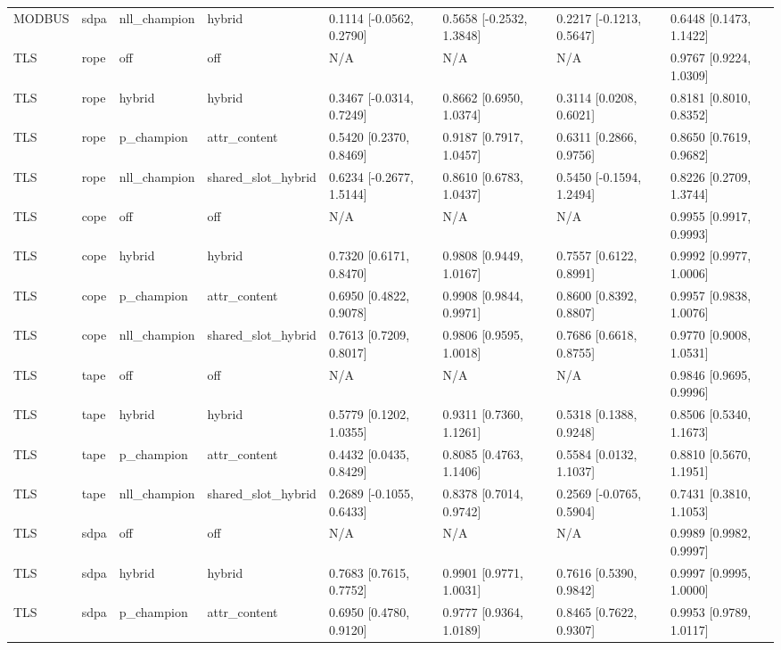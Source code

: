 \begin{tabular}{llllllll}
MODBUS & sdpa & nll\_champion & hybrid & 0.1114 [-0.0562, 0.2790] & 0.5658 [-0.2532, 1.3848] & 0.2217 [-0.1213, 0.5647] & 0.6448 [0.1473, 1.1422] \\
TLS & rope & off & off & N/A & N/A & N/A & 0.9767 [0.9224, 1.0309] \\
TLS & rope & hybrid & hybrid & 0.3467 [-0.0314, 0.7249] & 0.8662 [0.6950, 1.0374] & 0.3114 [0.0208, 0.6021] & 0.8181 [0.8010, 0.8352] \\
TLS & rope & p\_champion & attr\_content & 0.5420 [0.2370, 0.8469] & 0.9187 [0.7917, 1.0457] & 0.6311 [0.2866, 0.9756] & 0.8650 [0.7619, 0.9682] \\
TLS & rope & nll\_champion & shared\_slot\_hybrid & 0.6234 [-0.2677, 1.5144] & 0.8610 [0.6783, 1.0437] & 0.5450 [-0.1594, 1.2494] & 0.8226 [0.2709, 1.3744] \\
TLS & cope & off & off & N/A & N/A & N/A & 0.9955 [0.9917, 0.9993] \\
TLS & cope & hybrid & hybrid & 0.7320 [0.6171, 0.8470] & 0.9808 [0.9449, 1.0167] & 0.7557 [0.6122, 0.8991] & 0.9992 [0.9977, 1.0006] \\
TLS & cope & p\_champion & attr\_content & 0.6950 [0.4822, 0.9078] & 0.9908 [0.9844, 0.9971] & 0.8600 [0.8392, 0.8807] & 0.9957 [0.9838, 1.0076] \\
TLS & cope & nll\_champion & shared\_slot\_hybrid & 0.7613 [0.7209, 0.8017] & 0.9806 [0.9595, 1.0018] & 0.7686 [0.6618, 0.8755] & 0.9770 [0.9008, 1.0531] \\
TLS & tape & off & off & N/A & N/A & N/A & 0.9846 [0.9695, 0.9996] \\
TLS & tape & hybrid & hybrid & 0.5779 [0.1202, 1.0355] & 0.9311 [0.7360, 1.1261] & 0.5318 [0.1388, 0.9248] & 0.8506 [0.5340, 1.1673] \\
TLS & tape & p\_champion & attr\_content & 0.4432 [0.0435, 0.8429] & 0.8085 [0.4763, 1.1406] & 0.5584 [0.0132, 1.1037] & 0.8810 [0.5670, 1.1951] \\
TLS & tape & nll\_champion & shared\_slot\_hybrid & 0.2689 [-0.1055, 0.6433] & 0.8378 [0.7014, 0.9742] & 0.2569 [-0.0765, 0.5904] & 0.7431 [0.3810, 1.1053] \\
TLS & sdpa & off & off & N/A & N/A & N/A & 0.9989 [0.9982, 0.9997] \\
TLS & sdpa & hybrid & hybrid & 0.7683 [0.7615, 0.7752] & 0.9901 [0.9771, 1.0031] & 0.7616 [0.5390, 0.9842] & 0.9997 [0.9995, 1.0000] \\
TLS & sdpa & p\_champion & attr\_content & 0.6950 [0.4780, 0.9120] & 0.9777 [0.9364, 1.0189] & 0.8465 [0.7622, 0.9307] & 0.9953 [0.9789, 1.0117] \\

\end{tabular}
